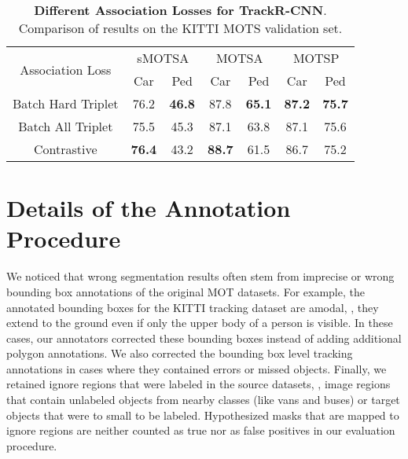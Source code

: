 \documentclass[10pt,twocolumn,letterpaper]{article}
\newcounter{row}
\begin{document}
\begin{table}[h]
\begin{centering}
\begin{tabular}{ccccccc}
\toprule
\multirow{2}{*}{{\footnotesize{}Association Loss}} & \multicolumn{2}{c}{{\footnotesize{}sMOTSA}} & \multicolumn{2}{c}{{\footnotesize{}MOTSA}} & \multicolumn{2}{c}{{\footnotesize{}MOTSP}}\tabularnewline
 & {\footnotesize{}Car} & {\footnotesize{}Ped} & {\footnotesize{}Car} & {\footnotesize{}Ped} & {\footnotesize{}Car} & {\footnotesize{}Ped}\tabularnewline
\midrule
{\footnotesize{}Batch Hard Triplet} & {\footnotesize{}76.2} & {\footnotesize{}\textbf{46.8}} & {\footnotesize{}87.8} & {\footnotesize{}\textbf{65.1}} & {\footnotesize{}\textbf{87.2}} & {\footnotesize{}\textbf{75.7}}\tabularnewline
{\footnotesize{}Batch All Triplet} & {\footnotesize{}75.5} & {\footnotesize{}45.3} & {\footnotesize{}87.1} & {\footnotesize{}63.8} & {\footnotesize{}87.1} & {\footnotesize{}75.6}\tabularnewline
{\footnotesize{}Contrastive} & {\footnotesize{}\textbf{76.4}} & {\footnotesize{}43.2} & {\footnotesize{}\textbf{88.7}} & {\footnotesize{}61.5} & {\footnotesize{}86.7} & {\footnotesize{}75.2}\tabularnewline
\bottomrule
\end{tabular}
\par\end{centering}
\caption{\label{tab:results-embedding}\textbf{Different Association Losses for TrackR-CNN}. Comparison of results on the KITTI MOTS validation set.}
\end{table}




\section{Details of the Annotation Procedure}
We noticed that wrong segmentation results often stem from imprecise or wrong bounding box annotations of the original MOT datasets. For example, the annotated bounding boxes for the KITTI tracking dataset \cite{Geiger12CVPR} are amodal, \ie, they extend to the ground even if only the upper body of a person is visible.
In these cases, our annotators corrected these bounding boxes instead of adding additional polygon annotations.
We also corrected the bounding box level tracking annotations in cases where they contained errors or missed objects.
Finally, we retained ignore regions that were labeled in the source datasets, \ie, image regions that contain unlabeled objects from nearby classes (like vans and buses) or target objects that were to small to be labeled.
Hypothesized masks that are mapped to ignore regions are neither counted as true nor as false positives in our evaluation procedure.
\end{document}
